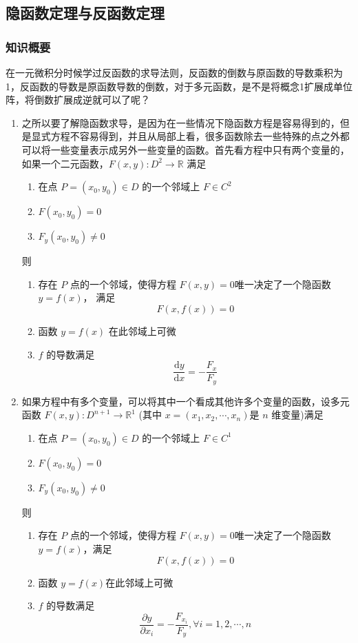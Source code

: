 \subsection{隐函数定理与反函数定理}
\subsubsection{知识概要}
在一元微积分时候学过反函数的求导法则，反函数的倒数与原函数的导数乘积为1，反函数的导数是原函数导数的倒数，对于多元函数，是不是将概念1扩展成单位阵，将倒数扩展成逆就可以了呢？

\begin{enumerate}
    \item 之所以要了解隐函数求导，是因为在一些情况下隐函数方程是容易得到的，但是显式方程不容易得到，并且从局部上看，很多函数除去一些特殊的点之外都可以将一些变量表示成另外一些变量的函数。首先看方程中只有两个变量的，如果一个二元函数，$F(x,y): D^2 \to \mathbb{R}$ 满足
    \begin{enumerate}[(1)]
        \item 在点 $P=(x_0, y_0) \in D $ 的一个邻域上 $ F \in  C^2 $
        \item $F(x_0, y_0) = 0$
        \item $F_y(x_0, y_0) \neq 0$
    \end{enumerate}
    则
    \begin{enumerate}[(1)]
        \item 存在 $P$ 点的一个邻域，使得方程 $F(x,y) =0$唯一决定了一个隐函数 $y = f(x)$， 满足
        $$ F(x, f(x)) =0 $$
        \item 函数 $y = f(x)$ 在此邻域上可微
        \item $f$ 的导数满足
        $$ \frac{\mathrm{d} y}{\mathrm{d} x } = - \frac{F _x}{F _y} $$
    \end{enumerate}

    \item 如果方程中有多个变量，可以将其中一个看成其他许多个变量的函数，设多元函数 $F(x,y): D^{n+1} \to \mathbb{R} ^1$ (其中 $x = (x_1,x_2,\cdots, x_n)$是 $n$ 维变量)满足
    \begin{enumerate}[(1)]
        \item 在点 $P=(x_0 , y_0 ) \in D$ 的一个邻域上 $F \in C^1$
        \item $F(x_0, y_0) = 0$
        \item $F_y (x_0, y_0) \neq 0$
    \end{enumerate}
    则
    \begin{enumerate}[(1)]
        \item 存在 $P$ 点的一个邻域，使得方程 $F(x,y)=0$唯一决定了一个隐函数 $y = f(x)$，满足 
        $$ F(x,f(x)) = 0 $$
        \item 函数 $y = f(x)$在此邻域上可微
        \item $f$ 的导数满足
        $$ \frac{\partial y}{ \partial x_i} = - \frac{F_{x_i}}{F_y}, \forall i = 1,2,\cdots , n $$
    \end{enumerate}


\end{enumerate}
